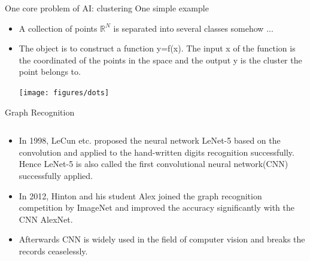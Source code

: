 \documentclass{beamer}
\begin{document}
\begin{CJK*}{UTF8}{gbsn}
\begin{frame}{One core problem of AI: clustering}
One simple example
\begin{itemize}
	\item A collection of points $\mathbb{R}^{N}$ is separated into several classes somehow ...
    \item The object is to construct a function y=f(x). The input x of the function is the coordinated of the points in the space and the output y is the cluster the point belongs to.
	\begin{center}
		\texttt{[image: figures/dots]} 
	\end{center}
\end{itemize}
\end{frame}



\begin{frame}{Graph Recognition}
\begin{columns}
\begin{column}{0.6\textwidth}
\begin{itemize}
\item In 1998, LeCun etc. proposed the neural network LeNet-5 based on the convolution and applied to the hand-written digits recognition successfully. Hence LeNet-5 is also called the first convolutional neural network(CNN) successfully applied.

\item In 2012, Hinton and his student Alex joined the graph recognition competition by ImageNet and improved the accuracy significantly with the CNN AlexNet.

\item Afterwards CNN is widely used in the field of computer vision and breaks the records ceaselessly.

\end{itemize}
\end{column}


\end{columns}
\end{frame}
\end{CJK*}
\end{document}
